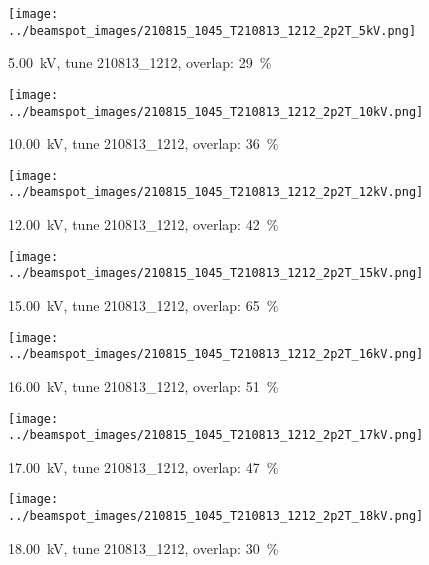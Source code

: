 \begin{figure}[ht]
\centering
\texttt{[image: ../beamspot\_images/210815\_1045\_T210813\_1212\_2p2T\_5kV.png]}
\caption[5.00 kV]{\SI{5.00}{\kV}, tune 210813\_1212, overlap: \SI{29}{\%}}
\label{5.00_kV}
\end{figure}

\begin{figure}[ht]
\centering
\texttt{[image: ../beamspot\_images/210815\_1045\_T210813\_1212\_2p2T\_10kV.png]}
\caption[10.00 kV]{\SI{10.00}{\kV}, tune 210813\_1212, overlap: \SI{36}{\%}}
\label{10.00_kV}
\end{figure}

\begin{figure}[ht]
\centering
\texttt{[image: ../beamspot\_images/210815\_1045\_T210813\_1212\_2p2T\_12kV.png]}
\caption[12.00 kV]{\SI{12.00}{\kV}, tune 210813\_1212, overlap: \SI{42}{\%}}
\label{12.00_kV}
\end{figure}

\begin{figure}[ht]
\centering
\texttt{[image: ../beamspot\_images/210815\_1045\_T210813\_1212\_2p2T\_15kV.png]}
\caption[15.00 kV]{\SI{15.00}{\kV}, tune 210813\_1212, overlap: \SI{65}{\%}}
\label{15.00_kV}
\end{figure}

\begin{figure}[ht]
\centering
\texttt{[image: ../beamspot\_images/210815\_1045\_T210813\_1212\_2p2T\_16kV.png]}
\caption[16.00 kV]{\SI{16.00}{\kV}, tune 210813\_1212, overlap: \SI{51}{\%}}
\label{16.00_kV}
\end{figure}

\begin{figure}[ht]
\centering
\texttt{[image: ../beamspot\_images/210815\_1045\_T210813\_1212\_2p2T\_17kV.png]}
\caption[17.00 kV]{\SI{17.00}{\kV}, tune 210813\_1212, overlap: \SI{47}{\%}}
\label{17.00_kV}
\end{figure}

\begin{figure}[ht]
\centering
\texttt{[image: ../beamspot\_images/210815\_1045\_T210813\_1212\_2p2T\_18kV.png]}
\caption[18.00 kV]{\SI{18.00}{\kV}, tune 210813\_1212, overlap: \SI{30}{\%}}
\label{18.00_kV}
\end{figure}

